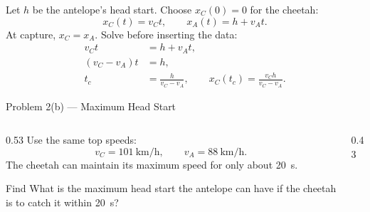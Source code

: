 \begin{solutionframe}
  \footnotesize
  Let $h$ be the antelope's head start. Choose $x_C(0)=0$ for the cheetah:
  \[
    x_C(t)=v_Ct,
    \qquad
    x_A(t)=h+v_At.
  \]
  At capture, $x_C=x_A$. Solve before inserting the data:
  \[
    \begin{aligned}
      v_Ct&=h+v_At,\\
      (v_C-v_A)t&=h,\\
      t_c&=\frac{h}{v_C-v_A},
      \qquad
      x_C(t_c)=\frac{v_Ch}{v_C-v_A}.
    \end{aligned}
  \]
\end{solutionframe}

\begin{frame}{Problem 2(b) — Maximum Head Start}
  \vspace{0.35em}
  \begin{columns}[T,onlytextwidth]
    \begin{column}{0.53\textwidth}
      \small
      Use the same top speeds:
      \[
        v_C=\SI{101}{\kilo\metre\per\hour},
        \qquad
        v_A=\SI{88}{\kilo\metre\per\hour}.
      \]
      The cheetah can maintain its maximum speed for only about
      \SI{20}{\second}.
      \vspace{0.55em}
      \begin{block}{Find}
        What is the maximum head start the antelope can have if the cheetah is
        to catch it within \SI{20}{\second}?
      \end{block}
    \end{column}
    \begin{column}{0.43\textwidth}
      \centering
      \begingroup
        \def\cheetahpartb{1}
        \resizebox{\textwidth}{!}{}
      \endgroup
    \end{column}
  \end{columns}
\end{frame}

